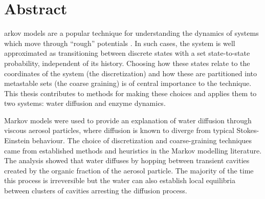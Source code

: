 %
%
%

\chapter*{Abstract}
\begin{SingleSpace}
arkov models  are a popular technique for understanding the dynamics of systems which move through ``rough'' potentials \cite{zwanzigDiffusionRoughPotential1988}. In such cases, the system is well approximated as transitioning between discrete states with a set state-to-state probability, independent of its history. Choosing how these states relate to the coordinates of the system (the discretization) and how these are partitioned into metastable sets (the coarse graining) is of central importance to the technique.  This thesis contributes to methods for making these choices and applies them to two systems: water diffusion and enzyme dynamics.
 
Markov models were used to provide an explanation of water diffusion through viscous aerosol particles, where diffusion is known to diverge from typical Stokes-Einstein behaviour. The choice of discretization and coarse-graining techniques came from established methods and heuristics in the Markov modelling literature. The analysis showed that water diffuses by hopping between transient cavities created by the organic fraction of the aerosol particle. The majority of the time this process is irreversible but the water can also establish local equilibria between clusters of cavities arresting the diffusion process. 


\end{SingleSpace}
